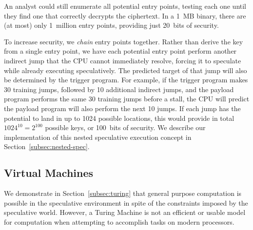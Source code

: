 An analyst could still enumerate all potential entry points, testing each one
until they find one that correctly decrypts the ciphertext. In a 1~MB binary,
there are (at most) only 1~million entry points, providing just 20~bits of
security.

To increase security, we \emph{chain} entry points together. Rather than derive
the key from a single entry point, we have each potential entry point perform
another indirect jump that the CPU cannot immediately resolve, forcing it to
speculate while already executing speculatively. The predicted target of that jump
will also be determined by the trigger program. For example, if the trigger
program makes 30 training jumps, followed by 10 additional indirect jumps, and
the payload program performs the same 30 training jumps before a stall, the CPU
will predict the payload program will also perform the next 10 jumps. If each
jump has the potential to land in up to 1024 possible locations, this would
provide in total $1024^{10} = 2^{100}$ possible keys, or 100~bits of security.
We describe our implementation of this nested speculative execution concept in
Section~\ref{subsec:nested-spec}.


%


% 
% 

\subsection{Virtual Machines}
We demonstrate in Section~\ref{subsec:turing} that general purpose computation 
is possible in the speculative environment in spite of the constraints 
imposed by the speculative world. However, a Turing Machine
is not an efficient or usable model for computation when
attempting to accomplish tasks on modern processors. 


